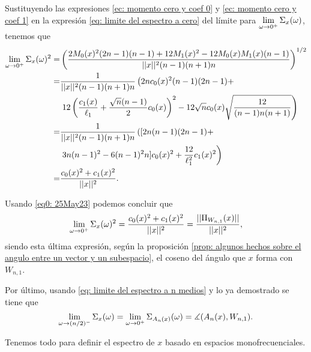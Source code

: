 Sustituyendo las expresiones 
\eqref{ec: momento cero y coef 0} y
\eqref{ec: momento cero y coef 1} en la expresión 
\eqref{eq: limite del espectro a cero} del límite para 
$\lim\limits_{\omega \rightarrow 0^{+}}{\Sigma_{x}(\omega)}$,
tenemos que
\begin{align*}
\lim\limits_{\omega \rightarrow 0^{+}}{\Sigma_{x}(\omega)^{2}}
= & 
\left(
\frac{
2M_{0}(x)^{2}(2n-1)(n-1) + 12M_{1}(x)^{2} - 12M_{0}(x)M_{1}(x)(n-1)
}{
||x||^{2} (n-1)(n+1)n}
\right)^{1/2} \\
= & \frac{1}{||x||^{2}
(n-1)(n+1)n
} 
\left(
2nc_{0}(x)^{2}(n-1)(2n-1) + \right. \\
& \left.
12
\left(
\frac{c_{1}(x)}{\ell_{1}} + 
\frac{\sqrt{n}(n-1)}{2}c_{0}(x)
\right)^{2}-12
\sqrt{n} c_{0}(x) \sqrt{\frac{12}{
(n-1)n(n+1)
}} 
\right) \\
= & \frac{1}{||x||^{2}
(n-1)(n+1)n}
\left(
[2n(n-1)(2n-1) + \right. \\
& \left.
3n(n-1)^{2}-6(n-1)^{2}n]c_{0}(x)^{2}
+ \frac{12}{\ell^{2}_{1}}c_{1}(x)^{2}
\right) \\
= & \frac{c_{0}(x)^{2} + c_{1}(x)^{2}}{||x||^{2}}.
\end{align*}

\noindent
Usando \eqref{eq0: 25May23} podemos concluir
que
\[
\lim\limits_{\omega \rightarrow 0^{+}}{\Sigma_{x}(\omega)^{2}}
=  \frac{c_{0}(x)^{2} + c_{1}(x)^{2}}{||x||^{2}}
=  \frac{||\Pi_{W_{n,1}}(x)||}{||x||^{2}},
\]
siendo esta última expresión, según la proposición
\ref{prop: algunos hechos sobre el angulo entre un vector y un subespacio}, 
el coseno del ángulo que $x$ forma con $W_{n,1}$.  

Por último, usando
\eqref{eq: limite del espectro a n medios}
y lo ya demostrado se tiene que
$$\lim\limits_{\omega \rightarrow (n/2)^{-}}{\Sigma_{x}(\omega)}
= \lim\limits_{\omega \rightarrow 0^{+}}{\Sigma_{A_{n}(x)}(\omega)}
= \measuredangle(A_{n}(x), W_{n,1}).$$
\QEDB
\vspace{0.2cm}


Tenemos todo para definir el espectro de $x$
basado en espacios monofrecuenciales.

